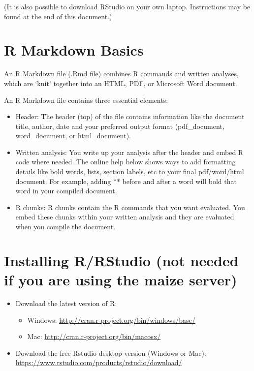 \documentclass[
]{book}
\providecommand{\tightlist}{%
  \setlength{\itemsep}{0pt}\setlength{\parskip}{0pt}}
\begin{document}
(It is also possible to download RStudio on your own laptop. Instructions may be found at the end of this document.)

\hypertarget{r-markdown-basics}{%
\section{R Markdown Basics}\label{r-markdown-basics}}

An R Markdown file (.Rmd file) combines R commands and written analyses, which are `knit' together into an HTML, PDF, or Microsoft Word document.

An R Markdown file contains three essential elements:

\begin{itemize}
\item
  Header: The header (top) of the file contains information like the document title, author, date and your preferred output format (pdf\_document, word\_document, or html\_document).
\item
  Written analysis: You write up your analysis after the header and embed R code where needed. The online help below shows ways to add formatting details like bold words, lists, section labels, etc to your final pdf/word/html document. For example, adding ** before and after a word will bold that word in your compiled document.
\item
  R chunks: R chunks contain the R commands that you want evaluated. You embed these chunks within your written analysis and they are evaluated when you compile the document.
\end{itemize}

\hypertarget{installing-rrstudio-not-needed-if-you-are-using-the-maize-server}{%
\section{Installing R/RStudio (not needed if you are using the maize server)}\label{installing-rrstudio-not-needed-if-you-are-using-the-maize-server}}

\begin{itemize}
\tightlist
\item
  Download the latest version of R:

  \begin{itemize}
  \tightlist
  \item
    Windows: \url{http://cran.r-project.org/bin/windows/base/}
  \item
    Mac: \url{http://cran.r-project.org/bin/macosx/}
  \end{itemize}
\item
  Download the free Rstudio desktop version (Windows or Mac): \url{https://www.rstudio.com/products/rstudio/download/}
\end{itemize}
\end{document}
